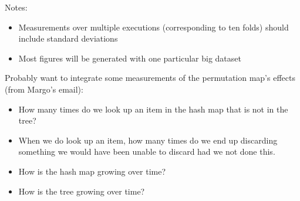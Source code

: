 













Notes:
\begin{itemize}

\item Measurements over multiple executions (corresponding to ten folds)
should include standard deviations

\item Most figures will be generated with one particular big dataset
\end{itemize}

Probably want to integrate some measurements of the permutation map's effects
(from Margo's email):
\begin{itemize}
\item How many times do we look up an item in the hash map that is not in the tree?

\item When we do look up an item, how many times do we end up discarding
      something we would have been unable to discard had we not done this.

\item How is the hash map growing over time?

\item How is the tree growing over time?
\end{itemize}

